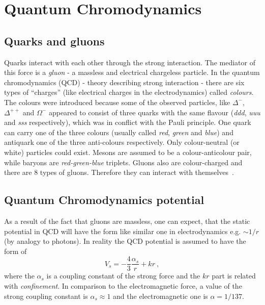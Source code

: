   \section{Quantum Chromodynamics}
    \subsection{Quarks and gluons}
      Quarks interact with each other through the strong interaction.
      The mediator of this force is a \textit{gluon} - a massless and electrical chargeless particle.
      In the quantum chromodynamics (QCD) - theory describing strong interaction - there are six types of ``charges'' (like electrical charges in the electrodynamics) called \textit{colours}.
      The colours were introduced because some of the observed particles, like $\Delta^{-}$, $\Delta^{++}$ and $\Omega^{-}$ appeared to consist of three quarks with the same flavour (\textit{ddd}, \textit{uuu} and \textit{sss} respectively), which was in conflict with the Pauli principle.
      One quark can carry one of the three colours (usually called \textit{red}, \textit{green} and \textit{blue}) and antiquark one of the three anti-colours respectively.
      Only colour-neutral (or white) particles could exist.
      Mesons are assumed to be a colour-anticolour pair, while baryons are \textit{red-green-blue} triplets.
      Gluons also are colour-charged and there are 8 types of gluons.
      Therefore they can interact with themselves~\cite{perkins}.
    \subsection{Quantum Chromodynamics potential}
      As a result of the fact that gluons are massless, one can expect, that the static potential in QCD will have the form like similar one in electrodynamics e.g. \mbox{$\sim 1/r$} (by analogy to photons).
      In reality the QCD potential is assumed to have the form of~\cite{perkins}
      \begin{equation}
        V_s = - \frac{4}{3} \frac{\alpha_s}{r} + kr~,
        \label{eq:qcd_potential}
      \end{equation}
      where the $\alpha_s$ is a coupling constant of the strong force and the $kr$ part is related with \textit{confinement}.
      In comparison to the electromagnetic force, a value of the strong coupling constant is $\alpha_s \approx 1$ and the electromagnetic one is $\alpha = 1/137$.

